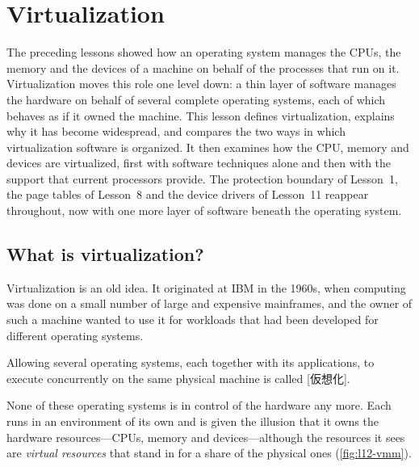 \documentclass[../main.tex]{subfiles}
\begin{document}
\chapter{Virtualization}

The preceding lessons showed how an operating system manages the CPUs, the
memory and the devices of a machine on behalf of the processes that run on
it.  Virtualization moves this role one level down: a thin layer of
software manages the hardware on behalf of several complete operating
systems, each of which behaves as if it owned the machine.  This lesson
defines virtualization, explains why it has become widespread, and compares
the two ways in which virtualization software is organized.  It then
examines how the CPU, memory and devices are virtualized, first with
software techniques alone and then with the support that current processors
provide.  The protection boundary of Lesson~1, the page tables of Lesson~8
and the device drivers of Lesson~11 reappear throughout, now with one more
layer of software beneath the operating system.

\section{What is virtualization?}
\label{sec:l12-what}

Virtualization is an old idea.  It originated at IBM in the 1960s, when
computing was done on a small number of large and expensive mainframes, and
the owner of such a machine wanted to use it for workloads that had been
developed for different operating systems.

\begin{definition}[Virtualization]
  Allowing several operating systems, each together with its applications,
  to execute concurrently on the same physical machine is called
  [仮想化].
\end{definition}

None of these operating systems is in control of the hardware any more.
Each runs in an environment of its own and is given the illusion that it
owns the hardware resources---CPUs, memory and devices---although the
resources it sees are \emph{virtual resources} that stand in for a share of
the physical ones (\cref{fig:l12-vmm}).
\end{document}
